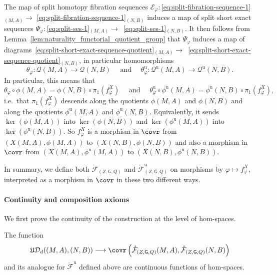 \documentclass[AHL,Unicode,published]{cedram}
\newcommand{\Int}{\mathring}
\newcommand{\unt}{\mathrm{u}}
\newcommand{\fU}{\ensuremath{\mathfrak{U}}}
\newcommand{\sG}{\mathsf{G}}
\newcommand{\cD}{\mathcal{D}}
\newcommand{\cE}{\mathcal{E}}
\newcommand{\cF}{\mathcal{F}}
\newcommand{\cQ}{\mathcal{Q}}
\newcommand{\too}{\ensuremath{\longrightarrow}}
\begin{document}
The map of split homotopy fibration sequences $\cE_{\varphi}\colon$\eqref{eq:split-fibration-sequence-1}$_{(M,A)}\to$ \eqref{eq:split-fibration-sequence-1}$_{(N,B)}$ induces a map of split short exact sequences $\Psi_{\varphi}\colon$\eqref{eq:split-ses-1}$_{(M,A)} \to$~\eqref{eq:split-ses-1}$_{(N,B)}$. It then follows from Lemma~\ref{lem:naturality_functorial_quotient_group} that $\Psi_{\varphi}$ induces a map of diagrams~\eqref{eq:split-short-exact-sequence-quotient}$_{(M,A)} \to$~\eqref{eq:split-short-exact-sequence-quotient}$_{(N,B)}$, in particular homomorphisms
\begin{equation}\label{eq:assignment_morphisms_theta}
\theta_{\varphi} \colon \cQ(M,A) \too \cQ(N,B) \quad \text{ and } \quad \theta^{\unt}_{\varphi} \colon \cQ^{\unt}(M,A) \too \cQ^{\unt}(N,B).
\end{equation}
In particular, this means that
\[
\theta_{\varphi} \circ \phi(M,A) = \phi(N,B) \circ \pi_{1}\left(f^{X}_{\varphi}\right)\quad \text{ and } \quad \theta^{\unt}_{\varphi} \circ \phi^{\unt}(M,A) = \phi^{\unt}(N,B) \circ \pi_{1}\left(f^{X}_{\varphi}\right),
\]
i.e.~that $\pi_{1}(f^X_\varphi)$ descends along the quotients $\phi(M,A)$ and $\phi(N,B)$ and along the quotients $\phi^{\unt}(M,A)$ and $\phi^{\unt}(N,B)$. Equivalently, it sends $\ker(\phi(M,A))$ into $\ker(\phi(N,B))$ and $\ker(\phi^{\unt}(M,A))$ into $\ker(\phi^{\unt}(N,B))$. So $f^{X}_{\varphi}$ is a morphism in $\covr$ from $(X(M,A),\phi(M,A))$ to $(X(N,B),\phi(N,B))$ and also a morphism in $\covr$ from $(X(M,A),\phi^{\unt}(M,A))$ to $(X(N,B),\phi^{\unt}(N,B))$.

In summary, we define both $\Int{\cF}_{(Z,\sG,Q)}$ and $\Int{\cF}^{\unt}_{(Z,\sG,Q)}$ on morphisms by $\varphi \mapsto f^{X}_{\varphi}$, interpreted as a morphism in $\covr$ in these two different ways.


\paragraph*{Continuity and composition axioms}

We first prove the continuity of the construction at the level of hom-spaces.

\begin{lemm}\label{lem:continuity_semifunctors}
The function
\[
\fU\cD_{d}((M,A),(N,B)) \too \covr\left(\Int{\cF}_{(Z,\sG,Q)}(M,A), \Int{\cF}_{(Z,\sG,Q)}(N,B)\right)
\]
and its analogue for $\Int{\cF}^{\unt}$ defined above are continuous functions of hom-spaces.
\end{lemm}
\end{document}
